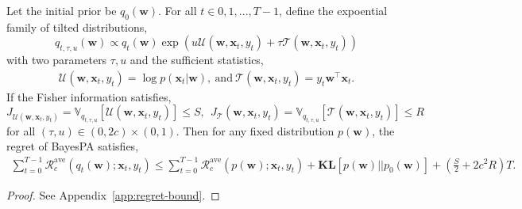 \documentclass[twoside,11pt]{article}
\newcommand{\xv}{\bm{x}}
\newcommand{\regret}{\mathcal{R}}
\newcommand{\wv}{\bm{w}}
\newcommand{\KL}{\textbf{KL}}
\newcommand{\var}{\mathbb{V}}
\begin{document}
{\begin{theorem}\label{tm:avg}
Let the initial prior be $q_0(\wv)$. For all $t \in {0,1,...,T-1}$, define the expoential family of tilted distributions,
\begin{equation*}
q_{t,\tau, u}(\wv) \propto q_t(\wv) \exp(u \mathcal{U}(\wv, \xv_t, y_t)+\tau \mathcal{T}(\wv, \xv_t, y_t))
\end{equation*}
with two parameters $\tau, u$ and the sufficient statistics,
\begin{eqnarray}
\mathcal{U}(\wv, \xv_t, y_t) = \log p(\xv_t | \wv),~\textrm{and}~\mathcal{T}(\wv, \xv_t, y_t) = y_t \wv^\top \xv_t. \nonumber
\end{eqnarray}
If the Fisher information satisfies,
\begin{equation*}
J_{\mathcal{U}(\wv, \xv_t, y_t)} = \var_{q_{t, \tau, u}}[\mathcal{U}(\wv, \xv_t, y_t)] \leq S, ~~
J_{\mathcal{T}}(\wv, \xv_t, y_t) = \var_{q_{t,\tau, u}}[\mathcal{T}(\wv, \xv_t, y_t)] \leq R
\end{equation*}
for all $(\tau,u) \in (0,2c) \times (0,1)$.
Then for any fixed distribution $p(\wv)$, the regret of BayesPA satisfies,
\textnormal{ \setlength\arraycolsep{1pt} \begin{eqnarray} \label{eq:avgnlpa_bound}
\sum\limits_{t=0}^{T-1}{\regret_c^\text{ave}(q_t(\wv); \xv_t, y_t)} \leq \sum\limits_{t=0}^{T-1}{\regret_c^\text{ave}(p(\wv); \xv_t, y_t)}+\KL[p(\wv)||p_0(\wv)]+\left( \frac{S}{2}+ 2 c^2 R \right) T.  \end{eqnarray}}
\end{theorem}
\begin{proof}
See Appendix~\ref{app:regret-bound}.
\end{proof}\vspace{-.5cm}

}
\end{document}
